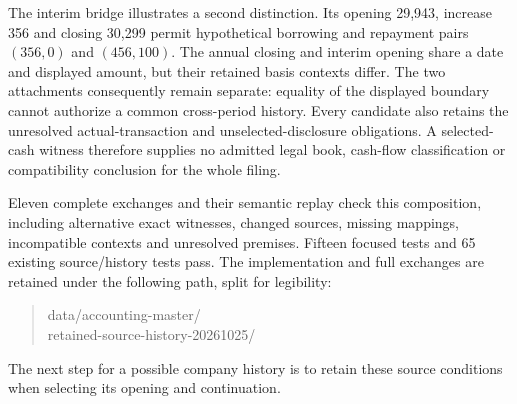The interim bridge illustrates a second distinction. Its opening 29,943,
increase 356 and closing 30,299 permit hypothetical borrowing and repayment
pairs \((356,0)\) and \((456,100)\). The annual closing and interim opening
share a date and displayed amount, but their retained basis contexts differ.
The two attachments consequently remain separate: equality of the displayed
boundary cannot authorize a common cross-period history. Every candidate also
retains the unresolved actual-transaction and unselected-disclosure obligations.
A selected-cash witness therefore supplies no admitted legal book, cash-flow
classification or compatibility conclusion for the whole filing.

Eleven complete exchanges and their semantic replay check this composition,
including alternative exact witnesses, changed sources, missing mappings,
incompatible contexts and unresolved premises. Fifteen focused tests and
65 existing source/history tests pass. The implementation and full exchanges
are retained under the following path, split for legibility:
\begin{quote}\small\ttfamily
data/accounting-master/\\
retained-source-history-20261025/
\end{quote}
The next step for a possible company history is to retain these source
conditions when selecting its opening and continuation.
